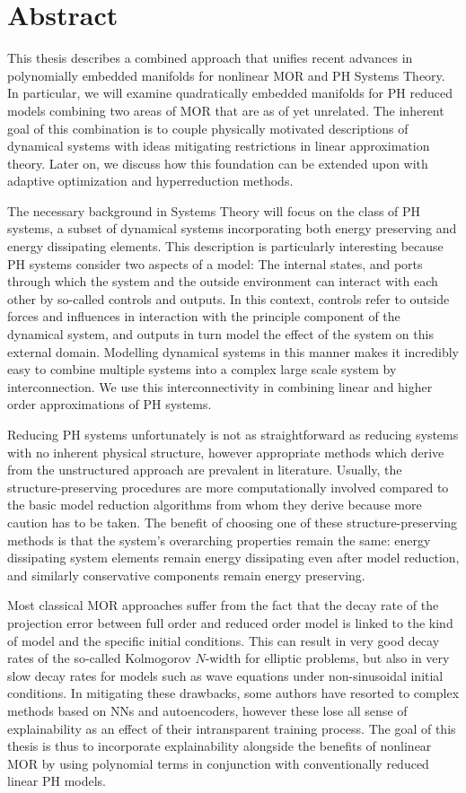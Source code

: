 \chapter*{Abstract}

This thesis describes a combined approach that unifies recent advances in polynomially embedded manifolds for nonlinear \acl{MOR} and \acl{PH} Systems Theory.
In particular, we will examine quadratically embedded manifolds for \acl{PH} reduced models combining two areas of \acl{MOR} that are as of yet unrelated.
The inherent goal of this combination is to couple physically motivated descriptions of dynamical systems with ideas mitigating restrictions in linear approximation theory.
Later on, we discuss how this foundation can be extended upon with adaptive optimization and hyperreduction methods.

The necessary background in Systems Theory will focus on the class of \acl{PH} systems, a subset of dynamical systems incorporating both energy preserving and energy dissipating elements.
This description is particularly interesting because \acl{PH} systems consider two aspects of a model: The internal states, and ports through which the system and the outside environment can interact with each other by so-called controls and outputs.
In this context, controls refer to outside forces and influences in interaction with the principle component of the dynamical system, and outputs in turn model the effect of the system on this external domain.
Modelling dynamical systems in this manner makes it incredibly easy to combine multiple systems into a complex large scale system by interconnection.
We use this interconnectivity in combining linear and higher order approximations of \acl{PH} systems.

Reducing \acl{PH} systems unfortunately is not as straightforward as reducing systems with no inherent physical structure, however appropriate methods which derive from the unstructured approach are prevalent in literature.
Usually, the structure-preserving procedures are more computationally involved compared to the basic model reduction algorithms from whom they derive because more caution has to be taken.
The benefit of choosing one of these structure-preserving methods is that the system's overarching properties remain the same: energy dissipating system elements remain energy dissipating even after model reduction, and similarly conservative components remain energy preserving.

Most classical \acl{MOR} approaches suffer from the fact that the decay rate of the projection error between full order and reduced order model is linked to the kind of model and the specific initial conditions.
This can result in very good decay rates of the so-called Kolmogorov $N$-width for elliptic problems, but also in very slow decay rates for models such as wave equations under non-sinusoidal initial conditions.
In mitigating these drawbacks, some authors have resorted to complex methods based on \aclp{NN} and autoencoders, however these lose all sense of explainability as an effect of their intransparent training process.
The goal of this thesis is thus to incorporate explainability alongside the benefits of nonlinear \acl{MOR} by using polynomial terms in conjunction with conventionally reduced linear \acl{PH} models.
